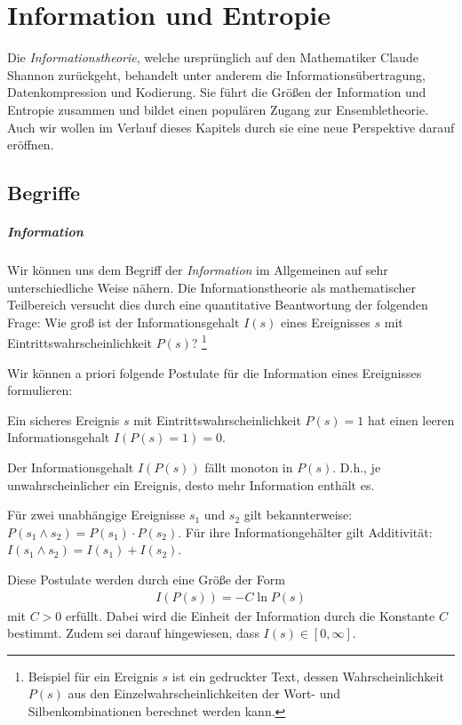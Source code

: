\chapter{Information und Entropie}
Die \emph{Informationstheorie}, welche ursprünglich auf den Mathematiker Claude Shannon zurückgeht, behandelt unter anderem die Informationsübertragung, Datenkompression und Kodierung. Sie führt die Größen der Information und Entropie zusammen und bildet einen populären Zugang zur Ensembletheorie. Auch wir wollen im Verlauf dieses Kapitels durch sie eine neue Perspektive darauf eröffnen.


\section{Begriffe}
\paragraph*{Information} Wir können uns dem Begriff der \emph{Information} im Allgemeinen auf sehr unterschiedliche Weise nähern. Die Informationstheorie als mathematischer Teilbereich versucht dies durch eine quantitative Beantwortung der folgenden Frage: Wie groß ist der Informationsgehalt $I(s)$ eines Ereignisses $s$  mit Eintrittswahrscheinlichkeit $P(s)$? \footnote{Beispiel für ein Ereignis $s$ ist ein gedruckter Text, dessen Wahrscheinlichkeit $P(s)$ aus den Einzelwahrscheinlichkeiten der Wort- und Silbenkombinationen berechnet werden kann.}

Wir können a priori folgende Postulate für die Information eines Ereignisses formulieren: 
\begin{postulate}
    Ein sicheres Ereignis $s$ mit Eintrittswahrscheinlichkeit $P(s)=1$ hat einen leeren Informationsgehalt $I(P(s)=1)=0$. 
\end{postulate}
\begin{postulate}
    Der Informationsgehalt $I(P(s))$ fällt monoton in $P(s)$. D.h., je unwahrscheinlicher ein Ereignis, desto mehr Information enthält es. 
\end{postulate}
\begin{postulate}
    Für zwei unabhängige Ereignisse $s_1$ und $s_2$ gilt bekannterweise: $P(s_1 \land  s_2)=P(s_1)\cdot P(s_2)$. Für ihre Informationgehälter gilt Additivität: $I(s_1 \land s_2)=I(s_1)+I(s_2)$. 
\end{postulate}
Diese Postulate werden durch eine Größe der Form 
\begin{align*}
    I(P(s))=-C\ln P(s)
\end{align*}
mit $C>0$ erfüllt. Dabei wird die Einheit der Information durch die Konstante $C$ bestimmt. Zudem sei darauf hingewiesen, dass $I(s)\in [0,\infty ]$.


